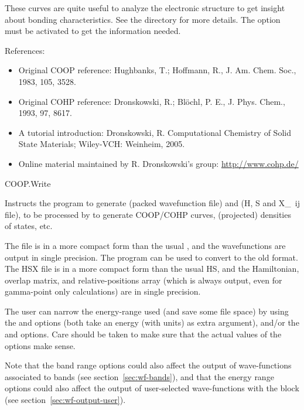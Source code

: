 These curves are quite useful to analyze the electronic structure to
get insight about bonding characteristics. See the 
directory for more details. The  option must be
activated to get the information needed.

References:
\begin{itemize}
  \item%
  Original COOP reference:
  Hughbanks, T.; Hoffmann, R., J. Am. Chem. Soc., 1983, 105, 3528.

  \item%
  Original COHP reference: Dronskowski, R.; Blöchl, P. E., J. Phys. Chem., 1993, 97, 8617.

  \item%
  A tutorial introduction: Dronskowski, R. Computational Chemistry of Solid State
  Materials; Wiley-VCH: Weinheim, 2005.

  \item%
  Online material maintained by R. Dronskowski's group: \url{http://www.cohp.de/}
\end{itemize}


\begin{fdflogicalF}{COOP.Write}
  
  Instructs the program to generate  (packed
  wavefunction file) and   (H, S and X\_~{ij} file),
  to be processed by  to generate COOP/COHP curves,
  (projected) densities of states, etc.

  The  file is in a more compact form than the usual
  , and the wavefunctions are output in single
  precision. The  program can be used to
  convert to the old format.  The HSX file is in a more compact form
  than the usual HS, and the Hamiltonian, overlap matrix, and
  relative-positions array (which is always output, even for
  gamma-point only calculations) are in single precision.

  The user can narrow the energy-range used (and save some file space)
  by using the  and  options
  (both take an energy (with units) as extra argument), and/or the
   and  options. Care should be
  taken to make sure that the actual values of the options make sense.

  Note that the band range options could also affect the output of
  wave-functions associated to bands (see section~\ref{sec:wf-bands}),
  and that the energy range options could also affect the output of
  user-selected wave-functions with the  block
  (see section~\ref{sec:wf-output-user}).

\end{fdflogicalF}



